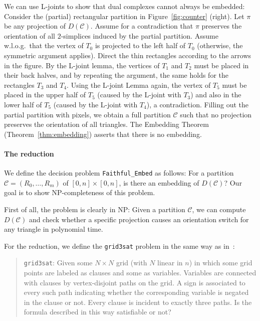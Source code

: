 \documentclass[12pt]{article}
\newcommand{\partition}{\mathcal{C}}
\begin{document}
We can use L-joints to show that dual complexes cannot always be embedded:
Consider the (partial) rectangular partition in Figure~\ref{fig:counter} (right).
Let $\pi$ be any projection of $D(\partition)$. 
Assume for a contradiction that $\pi$ preserves the orientation
of all $2$-simplices induced by the partial partition. 
Assume w.l.o.g.\ that the vertex of $T_0$ is projected
to the left half of $T_0$ (otherwise, the symmetric argument applies).
Direct the thin rectangles according to the arrows in the figure.
By the L-joint lemma, the vertices of $T_1$ and $T_2$ must be placed in their
back halves, and by repeating the argument, the same holds for the rectangles $T_3$ and $T_4$.
Using the L-joint Lemma again, the vertex of $T_5$ must be placed in the upper half of $T_5$
(caused by the L-joint with $T_3$) and also in the lower half of $T_5$ (caused by the L-joint
with $T_4$), a contradiction.
Filling out the partial partition with pixels, we obtain a full partition $\partition$ such that
no projection preserves the orientation of all triangles. The Embedding Theorem (Theorem~\ref{thm:embedding}) asserts
that there is no embedding.

\paragraph{The reduction}
We define the decision problem \texttt{Faithful\_Embed} as follows:
For a partition
$\partition=(R_0,\ldots,R_m)$ of $[0,n]\times [0,n]$, is there an embedding of $D(\partition)$?
Our goal is to show NP-completeness of this problem. 

First of all, the problem is clearly in NP: Given a partition $\partition$, 
we can compute $D(\partition)$ and check whether a specific projection causes an orientation switch 
for any triangle in polynomial time.

For the reduction, 
we define the \texttt{grid3sat} problem in the same way as in~\cite{godau-difficulty}:
\begin{quotation}
\texttt{grid3sat}: 
Given some $N\times N$ grid (with $N$ linear in $n$) in which some grid points are labeled
as clauses and some as variables. Variables are connected with clauses by vertex-disjoint
paths on the grid. A sign is associated to every such path indicating whether the corresponding
variable is negated in the clause or not. Every clause is incident to exactly three paths.
Is the formula described in this way satisfiable or not? 
\end{quotation}
\end{document}
